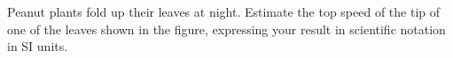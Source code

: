 Peanut plants fold up their leaves at night. Estimate
the top speed of the tip of one of the leaves shown in the
figure, expressing your result in scientific notation in SI units. \answercheck
